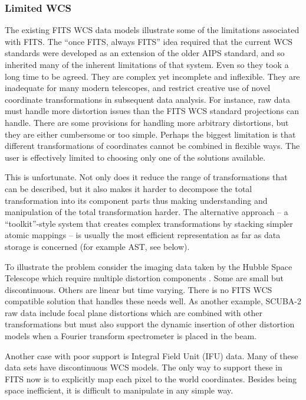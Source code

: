 \documentclass[final,authoryear,5p,times,twocolumn]{elsarticle}
\begin{document}
{{\subsubsection{Limited WCS}
\label{sec:wcs}


The existing FITS WCS data models illustrate some of the limitations
associated with FITS. The ``once FITS, always FITS'' idea required that
the current WCS standards were developed as an extension of the older
AIPS standard, and so inherited many of the inherent limitations of
that system. Even so they took a long time to be agreed. They are
complex yet incomplete and inflexible. They are inadequate for many
modern telescopes, and restrict creative use of novel coordinate
transformations in subsequent data analysis. For instance, raw data
must handle more distortion issues than the FITS WCS standard
projections can handle. There are some provisions for handling more
arbitrary distortions, but they are either cumbersome or too
simple. Perhaps the biggest limitation is that different
transformations of coordinates cannot be combined in flexible
ways. The user is effectively limited to choosing only one of the solutions
available.


This is unfortunate. Not only does it reduce the range of
transformations that can be described, but it also makes it harder to
decompose the total transformation into its component parts thus making
understanding and manipulation of the total transformation harder. The
alternative approach -- a ``toolkit''-style system that creates complex
transformations by stacking simpler atomic mappings -- is usually the
most efficient representation as far as data storage is concerned
(for example AST, see below).


To illustrate the problem consider the imaging data taken by the
Hubble Space Telescope which require multiple distortion components \citep[see e.g.,][]{2013ASPC..475...49H}.
Some are small but discontinuous. Others are linear but time varying.
There is no FITS WCS compatible solution that handles these needs well.
As another example, SCUBA-2 raw data \citep[see
e.g.,][]{2013MNRAS.430.2513H} include focal plane distortions which are
combined with other transformations but must also support the dynamic
insertion of other distortion models when a Fourier transform
spectrometer \citep{2010SPIE.7741E..67G} is placed in the beam.


Another case with poor support is Integral Field Unit (IFU) data.
Many of these data sets
have discontinuous WCS models. The only way to support these in FITS
now is to explicitly map each pixel to the world coordinates. Besides
being space inefficient, it is difficult to manipulate in any simple
way.


}}
\end{document}
